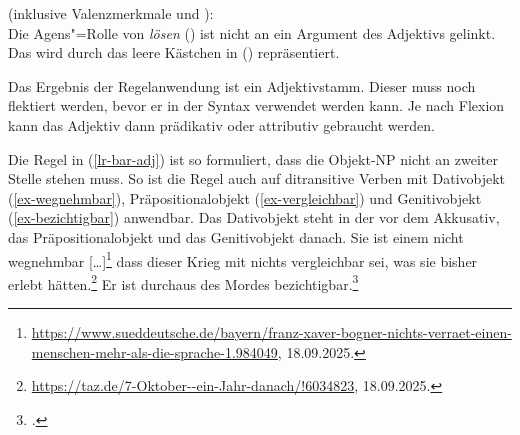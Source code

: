 \noindent
\eas
\label{le-lösbar}%
 (inklusive Valenzmerkmale und \subj):\\
\zs
Die Agens"=Rolle von \emph{lösen} (\argone) ist nicht an ein Argument des
Adjektivs gelinkt. Das wird durch das leere Kästchen in ()
repräsentiert.

Das Ergebnis der Regelanwendung ist ein Adjektivstamm. Dieser muss noch flektiert werden, 
bevor er in der Syntax verwendet werden kann. Je nach Flexion kann das Adjektiv dann
prädikativ oder attributiv gebraucht werden.

Die Regel in (\ref{lr-bar-adj}) ist so formuliert, dass die Objekt-NP nicht an zweiter Stelle stehen
muss. So ist die Regel auch auf ditransitive Verben mit Dativobjekt (\ref{ex-wegnehmbar}),
Präpositionalobjekt (\ref{ex-vergleichbar}) und Genitivobjekt (\ref{ex-bezichtigbar}) anwendbar. Das Dativobjekt steht in der \argstl vor dem
Akkusativ, das Präpositionalobjekt und das Genitivobjekt danach.
\eal
\ex\label{ex-wegnehmbar}
Sie ist einem nicht wegnehmbar [\ldots]\footnote{
  \url{https://www.sueddeutsche.de/bayern/franz-xaver-bogner-nichts-verraet-einen-menschen-mehr-als-die-sprache-1.984049},
  18.09.2025.
}
\ex\label{ex-vergleichbar}
dass dieser Krieg mit nichts vergleichbar sei, was sie bisher erlebt hätten.\footnote{
  \url{https://taz.de/7-Oktober--ein-Jahr-danach/!6034823}, 18.09.2025.
}
\ex\label{ex-bezichtigbar}
Er ist durchaus des Mordes bezichtigbar.\footnote{
.
}
\zl

